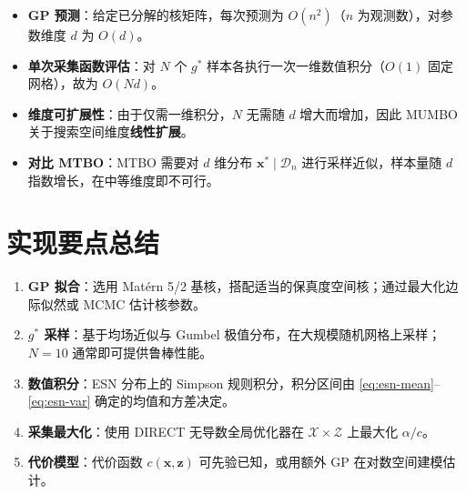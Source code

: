 \documentclass[11pt,a4paper]{article}
\newcommand{\bx}{\mathbf{x}}
\newcommand{\bz}{\mathbf{z}}
\newcommand{\cX}{\mathcal{X}}
\newcommand{\cZ}{\mathcal{Z}}
\newcommand{\cD}{\mathcal{D}}
\begin{document}
\begin{itemize}[nosep]
  \item \textbf{GP 预测}：给定已分解的核矩阵，每次预测为 $O(n^2)$（$n$ 为观测数），对参数维度 $d$ 为 $O(d)$。
  \item \textbf{单次采集函数评估}：对 $N$ 个 $g^*$ 样本各执行一次一维数值积分（$O(1)$ 固定网格），故为 $O(Nd)$。
  \item \textbf{维度可扩展性}：由于仅需一维积分，$N$ 无需随 $d$ 增大而增加，因此 MUMBO 关于搜索空间维度\textbf{线性扩展}。
  \item \textbf{对比 MTBO}：MTBO 需要对 $d$ 维分布 $\bx^*\mid\cD_n$ 进行采样近似，样本量随 $d$ 指数增长，在中等维度即不可行。
\end{itemize}

\section{实现要点总结}

\begin{enumerate}
  \item \textbf{GP 拟合}：选用 Mat\'ern 5/2 基核，搭配适当的保真度空间核；通过最大化边际似然或 MCMC 估计核参数。
  \item \textbf{$g^*$ 采样}：基于均场近似与 Gumbel 极值分布，在大规模随机网格上采样；$N=10$ 通常即可提供鲁棒性能。
  \item \textbf{数值积分}：ESN 分布上的 Simpson 规则积分，积分区间由 \eqref{eq:esn-mean}--\eqref{eq:esn-var} 确定的均值和方差决定。
  \item \textbf{采集最大化}：使用 DIRECT 无导数全局优化器在 $\cX\times\cZ$ 上最大化 $\alpha/c$。
  \item \textbf{代价模型}：代价函数 $c(\bx,\bz)$ 可先验已知，或用额外 GP 在对数空间建模估计。
\end{enumerate}
\end{document}
